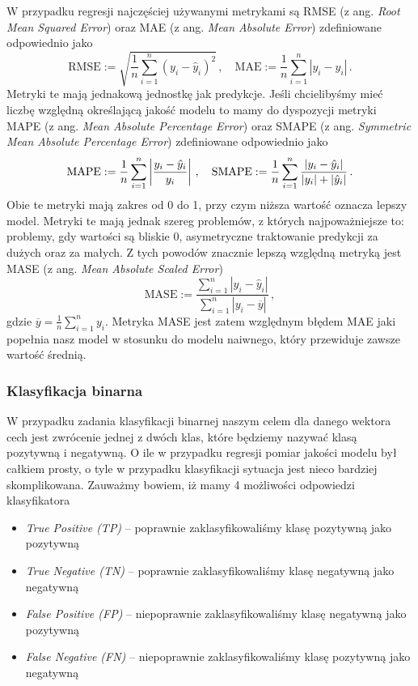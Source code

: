 \documentclass{myclass}
\numberwithin{equation}{subsection}
\begin{document}
W przypadku regresji najczęściej używanymi metrykami są RMSE (z ang. \textit{Root Mean Squared
Error}) oraz MAE (z ang. \textit{Mean Absolute Error}) zdefiniowane odpowiednio jako
\begin{equation}
    \mathrm{RMSE} := \sqrt{\frac{1}{n}\sum_{i=1}^n (y_i - \hat{y}_i)^2}\,,\quad\mathrm{MAE} := \frac{1}{n}\sum_{i=1}^n|y_i - \hat{y}_i|\,.
\end{equation}
Metryki te mają jednakową jednostkę jak predykcje. Jeśli chcielibyśmy mieć liczbę względną
określającą jakość modelu to mamy do dyspozycji metryki MAPE (z ang. \textit{Mean Absolute
Percentage Error}) oraz SMAPE (z ang. \textit{Symmetric Mean Absolute Percentage Error})
zdefiniowane odpowiednio jako
\begin{equation}
    \mathrm{MAPE} := \frac{1}{n}\sum_{i=1}^n\left|\frac{y_i - \hat{y}_i}{y_i}\right|\,,\quad\mathrm{SMAPE} := \frac{1}{n}\sum_{i=1}^n \frac{|y_i - \hat{y}_i|}{|y_i| + |\hat{y}_i|}\,.\\
\end{equation}
Obie te metryki mają zakres od 0 do 1, przy czym niższa wartość oznacza lepszy model. Metryki te
mają jednak szereg problemów, z których najpoważniejsze to: problemy, gdy wartości są bliskie 0,
asymetryczne traktowanie predykcji za dużych oraz za małych. Z tych powodów znacznie lepszą względną
metryką jest MASE (z ang. \textit{Mean Absolute Scaled Error})
\begin{equation}
    \mathrm{MASE} := \frac{\sum_{i=1}^n |y_i - \hat{y}_i|}{\sum_{i=1}^n |y_i - \overline{y}|}\,,
\end{equation}
gdzie \(\overline{y} = \frac{1}{n}\sum_{i=1}^n y_i\). Metryka MASE jest zatem względnym błędem MAE
jaki popełnia nasz model w stosunku do modelu naiwnego, który przewiduje zawsze wartość średnią.


\subsubsection{Klasyfikacja binarna}

W przypadku zadania klasyfikacji binarnej naszym celem dla danego wektora cech jest zwrócenie jednej
z dwóch klas, które będziemy nazywać klasą pozytywną i negatywną. O ile w przypadku regresji pomiar
jakości modelu był całkiem prosty, o tyle w przypadku klasyfikacji sytuacja jest nieco bardziej
skomplikowana. Zauważmy bowiem, iż mamy 4 możliwości odpowiedzi klasyfikatora
\begin{itemize}
    \item \textit{True Positive (TP)} -- poprawnie zaklasyfikowaliśmy klasę pozytywną jako pozytywną
    \item \textit{True Negative (TN)} -- poprawnie zaklasyfikowaliśmy klasę negatywną jako negatywną
    \item \textit{False Positive (FP)} -- niepoprawnie zaklasyfikowaliśmy klasę negatywną jako
    pozytywną
    \item \textit{False Negative (FN)} -- niepoprawnie zaklasyfikowaliśmy klasę pozytywną jako
    negatywną
\end{itemize}
\end{document}
